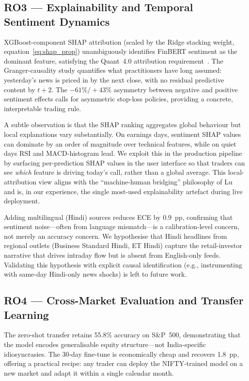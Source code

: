 \subsection{RO3 --- Explainability and Temporal Sentiment Dynamics}

XGBoost-component SHAP attribution (scaled by the Ridge stacking weight,
equation~\eqref{eq:shap_prop}) unambiguously identifies FinBERT sentiment as the
dominant feature, satisfying the Quant~4.0 attribution requirement~\cite{guo2024quant40}.
The Granger-causality study quantifies what practitioners have long assumed:
yesterday's news is priced in by the next close, with no residual predictive
content by $t+2$. The $-61\%/+43\%$ asymmetry between negative and positive
sentiment effects calls for asymmetric stop-loss policies, providing a
concrete, interpretable trading rule.

A subtle observation is that the SHAP ranking aggregates global behaviour
but local explanations vary substantially. On earnings days, sentiment
SHAP values can dominate by an order of magnitude over technical features,
while on quiet days RSI and MACD-histogram lead. We exploit this in the
production pipeline by surfacing per-prediction SHAP values in the user
interface so that traders can see \emph{which} feature is driving today's
call, rather than a global average. This local-attribution view aligns
with the ``machine-human bridging'' philosophy of Lu~\etal~\cite{lu2024bridging}
and is, in our experience, the single most-used explainability artefact
during live deployment.

Adding multilingual (Hindi) sources reduces ECE by 0.9~pp, confirming
that sentiment noise---often from language mismatch---is a calibration-level
concern, not merely an accuracy concern. We hypothesise that Hindi
headlines from regional outlets (Business Standard Hindi, ET Hindi) capture
the retail-investor narrative that drives intraday flow but is absent from
English-only feeds. Validating this hypothesis with explicit causal
identification (e.g., instrumenting with same-day Hindi-only news shocks)
is left to future work.

\subsection{RO4 --- Cross-Market Evaluation and Transfer Learning}

The zero-shot transfer retains 55.8\% accuracy on S\&P~500, demonstrating
that the model encodes generalisable equity structure---not India-specific
idiosyncrasies. The 30-day fine-tune is economically cheap and recovers
1.8~pp, offering a practical recipe: any trader can deploy the
NIFTY-trained model on a new market and adapt it within a single calendar
month.


